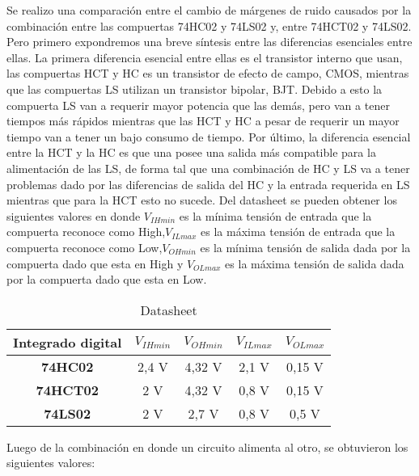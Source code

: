 Se realizo una comparación entre el cambio de márgenes de ruido causados por la combinación entre las compuertas 74HC02 y 74LS02 y, entre 74HCT02 y 74LS02. Pero primero expondremos una breve síntesis entre las diferencias esenciales entre ellas.
La primera diferencia esencial entre ellas es el transistor interno que usan, las compuertas HCT y HC es un transistor de efecto de campo, CMOS, mientras que las compuertas LS utilizan un transistor bipolar, BJT. Debido a esto la compuerta LS van a requerir mayor potencia que las demás, pero van a tener tiempos más rápidos mientras que las HCT y HC a pesar de requerir un mayor tiempo van a tener un bajo consumo de tiempo. Por último, la diferencia esencial entre la HCT y la HC es que una posee una salida más compatible para la alimentación de las LS, de forma tal que una combinación de HC y LS va a tener problemas dado por las diferencias de salida del HC y la entrada requerida en LS mientras que para la HCT esto no sucede.
Del datasheet se pueden obtener los siguientes valores en donde $V_{IHmin}$ es la mínima tensión de entrada que la compuerta reconoce como High,$V_{ILmax}$ es la máxima tensión de entrada que la compuerta reconoce como Low,$V_{OHmin}$ es la mínima tensión de salida dada por la compuerta dado que esta en High y $V_{OLmax}$ es la máxima tensión de salida dada por la compuerta dado que esta en Low.\\
\begin{center}
	\begin{table}[!h]
		\begin{center}
		\caption{Datasheet}
			\begin{tabular}{|c|c|c|c|c|}
				\hline
				\textbf{Integrado digital} & \textbf{$V_{IHmin}$} & \textbf{$V_{OHmin}$} & \textbf{$V_{ILmax}$}& \textbf{$V_{OLmax}$}\\
				\hline
				\textbf{74HC02} & 2,4 V & 4,32 V & 2,1 V & 0,15 V\\
				\hline
				\textbf{74HCT02} & 2 V & 4,32 V & 0,8 V & 0,15 V\\	
				\hline
				\textbf{74LS02} & 2 V & 2,7 V & 0,8 V & 0,5 V\\
				\hline
			\end{tabular}
		\end{center}
	\end{table}
\end{center}
Luego de la combinación  en donde un circuito alimenta al otro, se obtuvieron los siguientes valores:\\
\FloatBarrier
